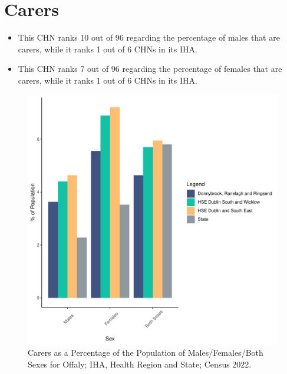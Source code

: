 \documentclass{article}
\begin{document}
\section{Carers}\label{sect:Carers}
\begin{itemize}
\item This CHN ranks  10 out of 96 regarding the percentage of males that are carers, while it ranks   1 out of 6 CHNs in its IHA.
\item This CHN ranks  7 out of 96 regarding the percentage of females that are carers, while it ranks   1 out of 6 CHNs in its IHA.
\end{itemize}
\begin{figure}[H]
	\centering
	\includegraphics[width = 150mm]{../figures/CareED.pdf}
	\caption{Carers as a Percentage of the Population of Males/Females/Both Sexes for Offaly; IHA, Health Region and State; Census 2022.}
	\label{fig:2ae19629-1a6a-13a3-e055-000000000001}
	\end{figure}
\end{document}
